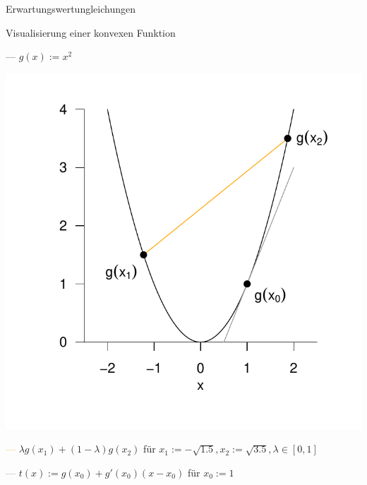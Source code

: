 \documentclass[
  8pt,
  ignorenonframetext,
]{beamer}
\begin{document}
\begin{frame}{Erwartungswertungleichungen}
\protect\hypertarget{erwartungswertungleichungen-4}{}
\small
\vspace{2mm}

Visualisierung einer konvexen Funktion

\center

--- \(g(x) := x^2\)

\begin{center}\includegraphics[width=0.55\linewidth]{7_Abbildungen/wtfi_7_jensensche_ungleichung} \end{center}
\vspace{-4mm}
\footnotesize

\textcolor{orange}{---} \(\lambda g(x_1) + (1 - \lambda)g(x_2)\) für
\(x_1 := -\sqrt{1.5}, x_2 := \sqrt{3.5}, \lambda \in [0,1]\)

\textcolor{gray}{---} \(t(x) := g(x_0) + g'(x_0)(x-x_0)\) für
\(x_0 := 1\)
\end{frame}
\end{document}

